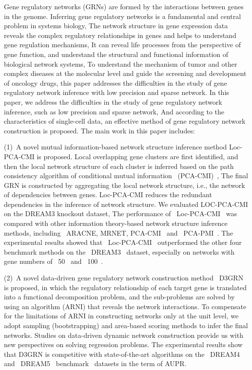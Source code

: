 \begin{abstracten}
Gene regulatory networks (GRNs) are formed by the interactions between genes in the genome.
Inferring gene regulatory networks is a fundamental and central problem in systems biology,
The network structure in gene expression data reveals the complex regulatory relationships in genes and helps to understand gene regulation mechanisms,
It can reveal life processes from the perspective of gene function, and understand the structural and functional information of biological network systems,
To understand the mechanism of tumor and other complex diseases at the molecular level and guide the screening and development of oncology drugs, this paper addresses the difficulties in the study of gene regulatory network inference with low precision and sparse network.
In this paper, we address the difficulties in the study of gene regulatory network inference, such as low precision and sparse network,
And according to the characteristics of single-cell data, an effective method of gene regulatory network construction is proposed.
The main work in this paper includes:

(1)~A novel mutual information-based network structure inference method Loc-PCA-CMI is proposed.
Local overlapping gene clusters are first identified, and then the local network structure of each cluster is inferred based on the path consistency algorithm of conditional mutual information ~(PCA-CMI)~,
The final GRN is constructed by aggregating the local network structure, i.e., the network of dependencies between genes.
Loc-PCA-CMI reduces the redundant dependencies in the inference of network structure.
We evaluated LOC-PCA-CMI on the DREAM3 knockout dataset,
The performance of ~Loc-PCA-CMI~ was compared with other information theory-based network structure inference methods, including ~ARACNE, MRNET, PCA-CMI~ and ~PCA-PMI~.
The experimental results showed that ~Loc-PCA-CMI~ outperformed the other four benchmark methods on the ~DREAM3~ dataset, especially on networks with gene numbers of ~50~ and ~100~.

(2)~A novel data-driven gene regulatory network construction method ~D3GRN is proposed, in which the regulatory relationship of each target gene is translated into a functional decomposition problem, 
and the sub-problems are solved by using an algorithm (ARNI) that reveals the network interactions. 
To compensate for the limitations of ARNI in constructing networks only at the unit level, 
we adopt sampling (bootstrapping) and area-based scoring methods to infer the final networks. 
Studies on data-driven dynamic network construction provide us with new perspectives on solving regression problems. 
The experimental results show that D3GRN is competitive with state-of-the-art algorithms on the ~DREAM4~ and ~DREAM5~ benchmark~ datasets in the term of AUPR.


\end{abstracten}

